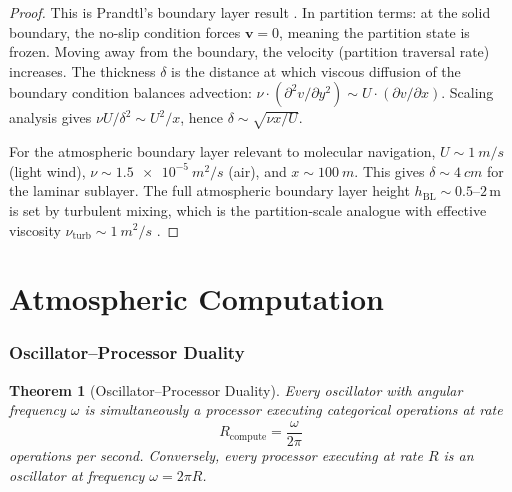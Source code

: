 \documentclass[11pt,twocolumn,a4paper]{article}
\theoremstyle{plain}
\newtheorem{theorem}{Theorem}[section]
\theoremstyle{definition}
\theoremstyle{remark}
\newcommand{\Rcompute}{R_{\mathrm{compute}}}
\newcommand{\hBL}{h_{\mathrm{BL}}}
\begin{document}
\begin{proof}
This is Prandtl's boundary layer result \cite{prandtl1904grenzschicht, schlichting2017boundary}. In partition terms: at the solid boundary, the no-slip condition forces $\mathbf{v} = 0$, meaning the partition state is frozen. Moving away from the boundary, the velocity (partition traversal rate) increases. The thickness $\delta$ is the distance at which viscous diffusion of the boundary condition balances advection: $\nu \cdot (\partial^2 v/\partial y^2) \sim U \cdot (\partial v / \partial x)$. Scaling analysis gives $\nu U/\delta^2 \sim U^2/x$, hence $\delta \sim \sqrt{\nu x / U}$.

For the atmospheric boundary layer relevant to molecular navigation, $U \sim \SI{1}{m/s}$ (light wind), $\nu \sim \SI{1.5e-5}{m^2/s}$ (air), and $x \sim \SI{100}{m}$. This gives $\delta \sim \SI{4}{cm}$ for the laminar sublayer. The full atmospheric boundary layer height $\hBL \sim 0.5\text{--}2$\,m is set by turbulent mixing, which is the partition-scale analogue with effective viscosity $\nu_{\mathrm{turb}} \sim \SI{1}{m^2/s}$ \cite{stull1988introduction}.
\end{proof}



\part{Atmospheric Computation}
\label{part:atmospheric}

\section{Oscillator--Processor Duality}
\label{sec:oscillator_processor}

\begin{theorem}[Oscillator--Processor Duality]
\label{thm:oscillator_processor}
Every oscillator with angular frequency $\omega$ is simultaneously a processor executing categorical operations at rate
\begin{equation}
\Rcompute = \frac{\omega}{2\pi}
\label{eq:Rcompute}
\end{equation}
operations per second. Conversely, every processor executing at rate $R$ is an oscillator at frequency $\omega = 2\pi R$.
\end{theorem}
\end{document}
